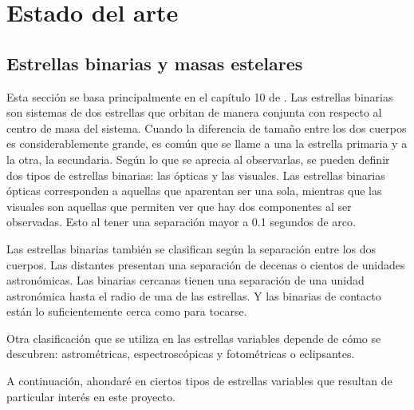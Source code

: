 \documentclass[12pt,letterpaper,oneside]{book}
\begin{document}

\mainmatter

\tableofcontents

\newpage

\listoffigures
\listoftables

\newpage

\visibleintentfalse

\chapter{Estado del arte}
\section{Estrellas binarias y masas estelares}
Esta sección se basa principalmente en el capítulo 10 de \cite{Karttunen2016}. Las estrellas binarias son sistemas de dos estrellas que orbitan de manera conjunta con respecto al centro de masa del sistema. Cuando la diferencia de tamaño entre los dos cuerpos es considerablemente grande, es común que se llame a una la estrella primaria y a la otra, la secundaria. Según lo que se aprecia al observarlas, se pueden definir dos tipos de estrellas binarias: las ópticas y las visuales. Las estrellas binarias ópticas corresponden a aquellas que aparentan ser una sola, mientras que las visuales son aquellas que permiten ver que hay dos componentes al ser observadas. Esto al tener una separación mayor a 0.1 segundos de arco. 

Las estrellas binarias también se clasifican según la separación entre los dos cuerpos. Las distantes presentan una separación de decenas o cientos de unidades astronómicas. Las binarias cercanas tienen una separación de una unidad astronómica hasta el radio de una de las estrellas. Y las binarias de contacto están lo suficientemente cerca como para tocarse. 

Otra clasificación que se utiliza en las estrellas variables depende de cómo se descubren: astrométricas, espectroscópicas y fotométricas o eclipsantes. 

A continuación, ahondaré en ciertos tipos de estrellas variables que resultan de particular interés en este proyecto. 
\end{document}
